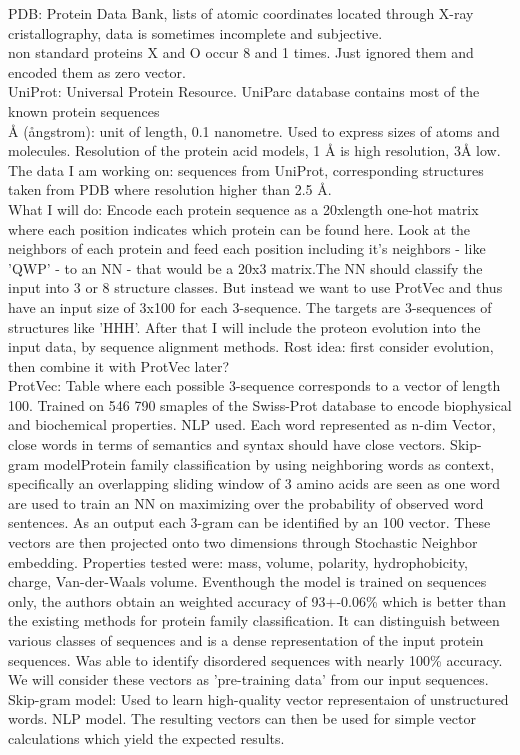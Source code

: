 \documentclass{article}
\begin{document}
PDB: Protein Data Bank, lists of atomic coordinates located through X-ray cristallography, data is sometimes incomplete and subjective.\\

non standard proteins X and O occur 8 and 1 times. Just ignored them and encoded them as zero vector.\\

UniProt: Universal Protein Resource. UniParc database contains most of the known protein sequences\\

Å (ångstrom): unit of length, 0.1 nanometre. Used to express sizes of atoms and molecules. Resolution of the protein acid models, 1 Å is high resolution, 3Å low. \\

The data I am working on: sequences from UniProt, corresponding structures taken from PDB where resolution higher than 2.5 Å.\\

What I will do: Encode each protein sequence as a 20xlength one-hot matrix where each position indicates which protein can be found here. Look at the neighbors of each protein and feed each position including it's neighbors - like 'QWP' - to an NN - that would be a 20x3 matrix.The NN should classify the input into 3 or 8 structure classes. But instead we want to use ProtVec and thus have an input size of 3x100 for each 3-sequence. The targets are 3-sequences of structures like 'HHH'. After that I will include the proteon evolution into the input data, by sequence alignment methods. Rost idea: first consider evolution, then combine it with ProtVec later? \\

ProtVec: Table where each possible 3-sequence corresponds to a vector of length 100. Trained on 546 790 smaples of the Swiss-Prot database to encode biophysical and biochemical properties. NLP used. Each word represented as n-dim Vector, close words in terms of semantics and syntax should have close vectors. Skip-gram modelProtein family classification by using neighboring words as context, specifically an overlapping sliding window of 3 amino acids are seen as one word are used to train an NN on maximizing over the probability of observed word sentences. As an output each 3-gram can be identified by an 100 vector. These vectors are then projected onto two dimensions through Stochastic Neighbor embedding. Properties tested were: mass, volume, polarity, hydrophobicity, charge, Van-der-Waals volume. Eventhough the model is trained on sequences only, the authors obtain an weighted accuracy of 93+-0.06\% which is better than the existing methods for protein family classification. It can distinguish between various classes of sequences and is a dense representation of the input protein sequences. Was able to identify disordered sequences with nearly 100\% accuracy. We will consider these vectors as 'pre-training data' from our input sequences.
Skip-gram model: Used to learn high-quality vector representaion of unstructured words. NLP model. The resulting vectors can then be used for simple vector calculations which yield the expected results.
\end{document}

